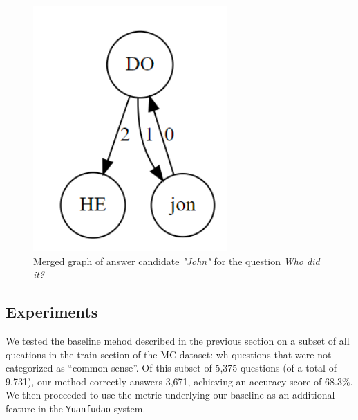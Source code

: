 \begin{figure}
	\centering
	\includegraphics[scale=0.3]{figures/merge}
	\caption{Merged graph of answer candidate \textit{"John"} for the
		question \textit{Who did it?}}
	\label{fig:merge}
\end{figure}

\subsection{Experiments}
\label{sec:exp}

We tested the baseline mehod described in the previous section on a
subset of all queations in the train section of the MC dataset:
wh-questions that were not
categorized as ``common-sense''. Of this subset of 5,375 questions (of a
total of 9,731), our
method correctly answers 3,671, achieving an accuracy score of $68.3\%$.
We then proceeded to use the metric underlying our baseline as an
additional feature in the \texttt{Yuanfudao} system.